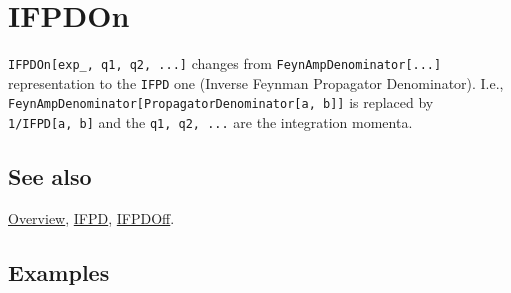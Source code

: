 \documentclass[../FeynCalcManual.tex]{subfiles}
\begin{document}
\hypertarget{ifpdon}{%
\section{IFPDOn}\label{ifpdon}}

\texttt{IFPDOn[\allowbreak{}exp_,\ \allowbreak{}q1,\ \allowbreak{}q2,\ \allowbreak{}...]}
changes from \texttt{FeynAmpDenominator[\allowbreak{}...]}
representation to the \texttt{IFPD} one (Inverse Feynman Propagator
Denominator). I.e.,
\texttt{FeynAmpDenominator[\allowbreak{}PropagatorDenominator[\allowbreak{}a,\ \allowbreak{}b]]}
is replaced by \texttt{1/IFPD[\allowbreak{}a,\ \allowbreak{}b]} and the
\texttt{q1,\ \allowbreak{}q2,\ \allowbreak{}...} are the integration
momenta.

\subsection{See also}

\hyperlink{toc}{Overview}, \hyperlink{ifpd}{IFPD},
\hyperlink{ifpdoff}{IFPDOff}.

\subsection{Examples}
\end{document}

